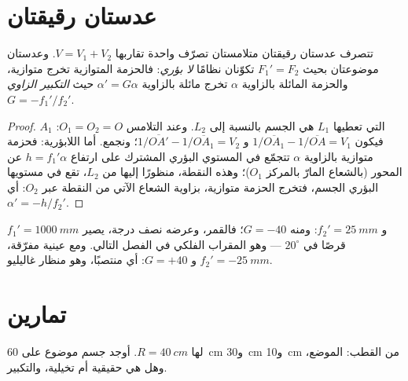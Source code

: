 \section{عدستان رقيقتان}

\begin{proposition}\label{prop:b1:mirrors-thin-lenses:doublet}
تتصرف عدستان رقيقتان متلامستان تصرّف  واحدة تقاربها
$V = V_1 + V_2$. وعدستان موضوعتان بحيث $F_1' = F_2$ تكوّنان نظامًا
\emph{لا بؤري}: فالحزمة المتوازية تخرج متوازية، والحزمة
المائلة بالزاوية $\alpha$ تخرج مائلة بالزاوية $\alpha' = G\alpha$ حيث
\emph{التكبير الزاوي} $G = -f_1'/f_2'$.
\end{proposition}

\begin{proof}
 $A_1$ التي تعطيها $L_1$ هي الجسم بالنسبة إلى $L_2$. وعند
التلامس $O_1 = O_2 = O$: فيكون $1/\overline{OA_1} - 1/\overline{OA} = V_1$ و
$1/\overline{OA'} - 1/\overline{OA_1} = V_2$؛ ونجمع. أما اللابؤرية: فحزمة
متوازية بالزاوية $\alpha$ تتجمّع في المستوي البؤري المشترك على ارتفاع
$h = f_1'\alpha$ عن المحور (بالشعاع المارّ بالمركز $O_1$)؛ وهذه النقطة، منظورًا
إليها من $L_2$، تقع في مستويها البؤري الجسم، فتخرج الحزمة متوازية،
بزاوية الشعاع الآتي من النقطة عبر $O_2$: أي $\alpha' = -h/f_2'$.
\end{proof}

\begin{example}\label{ex:b1:mirrors-thin-lenses:afocal}
$f_1' = \qty{1000}{mm}$ و $f_2' = \qty{25}{mm}$: ومنه $G = -40$؛ فالقمر،
وعرضه نصف درجة، يصير قرصًا في $20^\circ$ --- وهو المقراب
الفلكي في الفصل التالي. ومع عينية مفرّقة،
$f_2' = \qty{-25}{mm}$ و $G = +40$: أي منتصبًا، وهو منظار غاليليو.
\end{example}

\section{تمارين}

\begin{exercise}[$\star$]\label{exo:b1:mirrors-thin-lenses:1}
 لها $R = \qty{40}{cm}$. أوجد  جسم
موضوع على \qty{60}{cm} و\qty{30}{cm} و\qty{10}{cm} من القطب:
الموضع، وهل هي حقيقية أم تخيلية، والتكبير.
\end{exercise}

